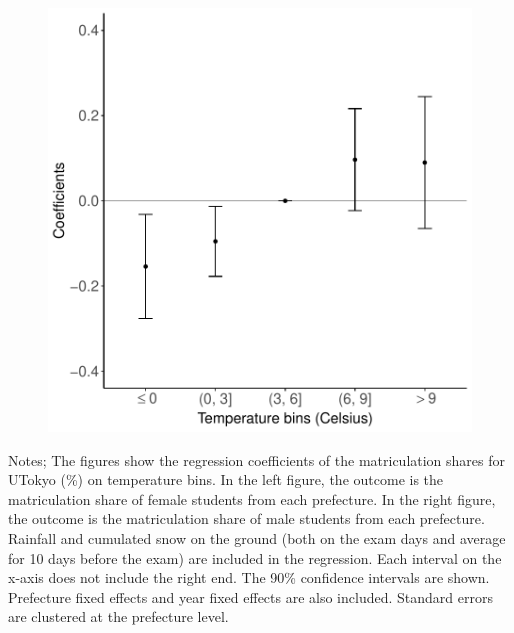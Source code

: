 \documentclass[9pt, pdfmx,hiresbb]{beamer}
\begin{document}
\begin{frame}
\begin{minipage}{0.49\textwidth}
\begin{figure}[h]
      \includegraphics[width = \textwidth]{../Output/images/reg_gender_4.pdf}
      \centering
    \end{figure}
  \end{minipage}
  \tiny
  \begin{tablenotes}
  \item Notes;
    The figures show the regression coefficients of the matriculation shares for UTokyo (\%) on temperature bins.
    In the left figure, the outcome is the matriculation share of female students from each prefecture.
    In the right figure, the outcome is the matriculation share of male students from each prefecture.
    Rainfall and cumulated snow on the ground (both on the exam days and average for 10 days before the exam) are included in the regression.
    Each interval on the x-axis does not include the right end.
    The 90\% confidence intervals are shown.
    Prefecture fixed effects and year fixed effects are also included.
    Standard errors are clustered at the prefecture level.
  \end{tablenotes}
\end{frame}
\end{document}
